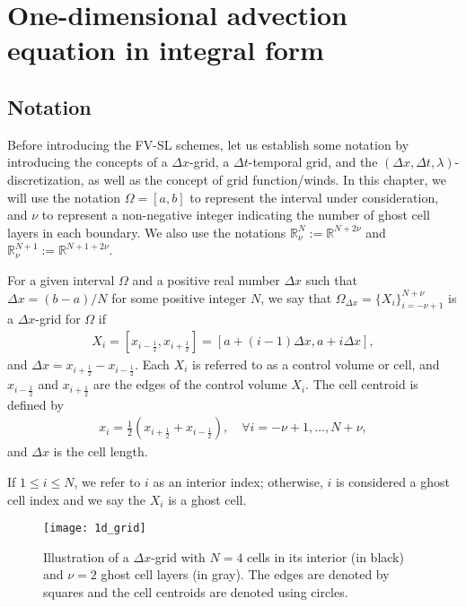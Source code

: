 \section{One-dimensional advection equation in integral form}
\label{chp2-sec1}

\subsection{Notation}
\label{chp2-sec-not}
Before introducing the FV-SL schemes, let us establish some notation by introducing
the concepts of a $\Delta x$-grid, a $\Delta t$-temporal grid, and the
$(\Delta x, \Delta t, \lambda)$-discretization, as well as the concept of grid function/winds.
In this chapter, we will use the notation $\Omega=[a,b]$ to represent the interval under consideration,
and $\nu$ to represent a non-negative integer indicating the number of ghost cell layers in each boundary.
We also use the notations $\mathbb{R}^{N}_{\nu}:=\mathbb{R}^{N+2\nu}$ and
$\mathbb{R}^{N+1}_{\nu}:=\mathbb{R}^{N+1+2\nu}$.
\begin{definition}\label{chp2-def-dxgrid}
	For a given interval $\Omega$ and a positive real number $\Delta x$ such that 
    $\Delta x = (b-a)/N$ for some positive integer $N$, 
	we say that $\Omega_{\Delta x}= \{X_i \}_{i=-\nu+1}^{N+\nu}$ is a $\Delta x$-grid for $\Omega$ if
	\begin{align*}
        X_i = [x_{i-\frac{1}{2}},x_{i+\frac{1}{2}}] = [a+(i-1)\Delta x, a+i\Delta x],
    \end{align*}
	and $\Delta x = x_{i+\frac{1}{2}} - x_{i-\frac{1}{2}}$. 
	Each $X_i$ is referred to as a control volume or cell, and $x_{i-\frac{1}{2}}$ and 
	$x_{i+\frac{1}{2}}$ are the edges of the control volume $X_i$.
	The cell centroid is defined by
    \begin{align*}
    x_i = \frac{1}{2}(x_{i+\frac{1}{2}} + x_{i-\frac{1}{2}}),\quad \forall i = -\nu+1, \ldots, N+\nu,
    \end{align*}
	and $\Delta x$ is the cell length.
\end{definition}
\begin{remark}
If $1 \leq i \leq N$, we refer to $i$ as an interior index;
otherwise, $i$ is considered a ghost cell index and we say the $X_i$ is a ghost cell.
\end{remark}
\begin{figure}[!htb]
	\centering
	\texttt{[image: 1d\_grid]}
	\caption{Illustration of a $\Delta x$-grid with $N=4$ cells in its interior (in black) 
         and $\nu=2$ ghost cell layers (in gray).
	 The edges are denoted by squares and the cell centroids are denoted using circles.\label{chp2-sec1-grid1d}}
\end{figure}
